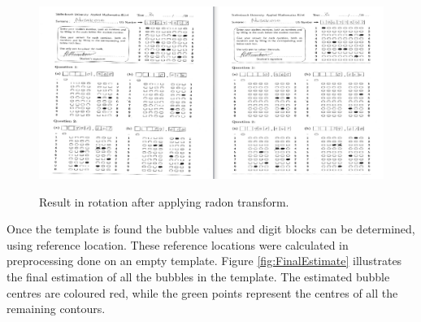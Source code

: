 \begin{figure}
  \centering
  \includegraphics[width=14cm]{Rotation}\\
  \caption{Result in rotation after applying radon transform.}
  \label{fig:rotate}
\end{figure}

Once the template is found the bubble values and digit blocks can be determined, using reference location. These reference locations were calculated in preprocessing done on an empty template. Figure \ref{fig:FinalEstimate} illustrates the final estimation of all the bubbles in the template. The estimated bubble centres are coloured red, while the green points represent the centres of all the remaining contours.

